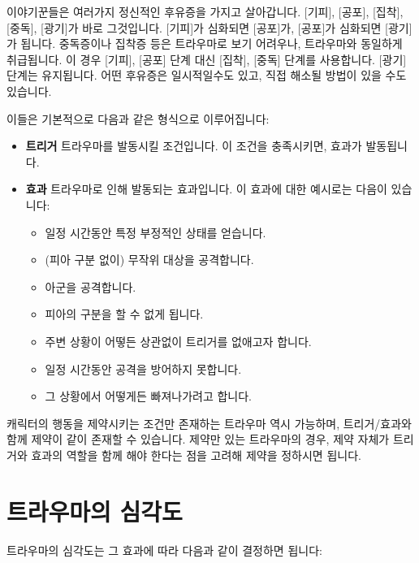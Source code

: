 \documentclass{report}
\begin{document}
	이야기꾼들은 여러가지 정신적인 후유증을 가지고 살아갑니다. [기피], [공포], [집착], [중독], [광기]가 바로 그것입니다. [기피]가 심화되면 [공포]가, [공포]가 심화되면 [광기]가 됩니다. 중독증이나 집착증 등은 트라우마로 보기 어려우나, 트라우마와 동일하게 취급됩니다. 이 경우 [기피], [공포] 단계 대신 [집착], [중독] 단계를 사용합니다. [광기] 단계는 유지됩니다. 어떤 후유증은 일시적일수도 있고, 직접 해소될 방법이 있을 수도 있습니다.
	
	이들은 기본적으로 다음과 같은 형식으로 이루어집니다:
	
	\begin{itemize}
		\item \textbf{트리거}
		\subitem 트라우마를 발동시킬 조건입니다. 이 조건을 충족시키면, 효과가 발동됩니다.
		
		\item \textbf{효과}
		\subitem 트라우마로 인해 발동되는 효과입니다. 이 효과에 대한 예시로는 다음이 있습니다:
		\begin{itemize}
			\item 일정 시간동안 특정 부정적인 상태를 얻습니다.
			\item (피아 구분 없이) 무작위 대상을 공격합니다.
			\item 아군을 공격합니다.
			\item 피아의 구분을 할 수 없게 됩니다.
			\item 주변 상황이 어떻든 상관없이 트리거를 없애고자 합니다.
			\item 일정 시간동안 공격을 방어하지 못합니다.
			\item 그 상황에서 어떻게든 빠져나가려고 합니다.
		\end{itemize}
	\end{itemize}
	
	캐릭터의 행동을 제약시키는 조건만 존재하는 트라우마 역시 가능하며, 트리거/효과와 함께 제약이 같이 존재할 수 있습니다. 제약만 있는 트라우마의 경우, 제약 자체가 트리거와 효과의 역할을 함께 해야 한다는 점을 고려해 제약을 정하시면 됩니다.
	
	\section*{트라우마의 심각도}
	
	트라우마의 심각도는 그 효과에 따라 다음과 같이 결정하면 됩니다:
	
	\smallskip
	
\end{document}
